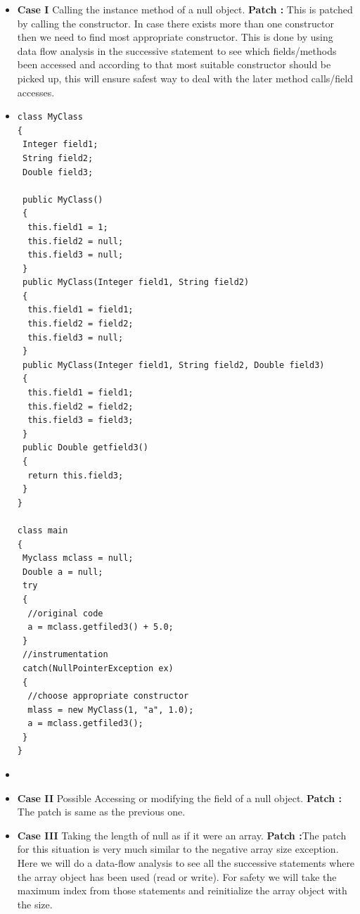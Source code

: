 \documentclass{sigplanconf}
\begin{document}
\begin{itemize}
  \item \textbf{Case I} Calling the instance method of a null object. \newline
  \textbf{Patch :} This is patched by calling the constructor. In case there
  exists more than one constructor then we need to find most appropriate
  constructor. This is done by using data flow analysis in the successive
  statement to see which fields/methods been accessed and according to that
  most suitable constructor should be picked up, this will ensure safest way to
  deal with the later method calls/field accesses.
  \item 
  
  \lstset{language=Java, caption=appropriate constructor, label=patchingexample2}

\begin{lstlisting}
class MyClass
{
 Integer field1;
 String field2;
 Double field3;

 public MyClass()
 {
  this.field1 = 1;
  this.field2 = null;
  this.field3 = null;
 } 
 public MyClass(Integer field1, String field2)
 {
  this.field1 = field1;
  this.field2 = field2;
  this.field3 = null;
 } 
 public MyClass(Integer field1, String field2, Double field3)
 {
  this.field1 = field1;
  this.field2 = field2;
  this.field3 = field3;
 }
 public Double getfield3()
 {
  return this.field3;
 }
}

class main
{
 Myclass mclass = null;
 Double a = null;
 try
 {
  //original code
  a = mclass.getfiled3() + 5.0;
 }
 //instrumentation
 catch(NullPointerException ex)
 {
  //choose appropriate constructor
  mlass = new MyClass(1, "a", 1.0); 
  a = mclass.getfiled3();
 }
}
\end{lstlisting}
  \item 
  
  \item \textbf{Case II} Possible Accessing or modifying the field of a null
  object.\newline
  \textbf{Patch :} The patch is same as the previous one.
  
  \item \textbf{Case III} Taking the length of null as if it were an
  array.\newline
  \textbf{Patch :}The patch for this situation is very much similar to the
  negative array size exception. Here we will do a data-flow analysis to see all
  the successive statements where the array object has been used (read or
  write). For safety we will take the maximum index from those statements and
  reinitialize the array object with the size.
    

\end{itemize}
\end{document}

